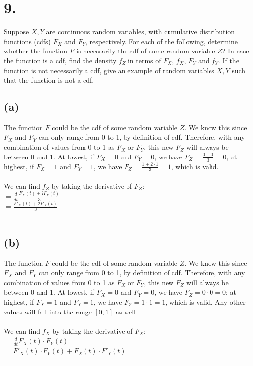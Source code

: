 \documentclass{article}
\begin{document}
\section*{9.}
{\Large 
Suppose $X,Y$ are continuous random variables, with cumulative distribution
functions (cdfs) $F_{X}$ and $F_{Y}$, respectively. For each of
the following, determine whether the function $F$ is necessarily
the cdf of some random variable $Z$? In case the function is a cdf,
find the density $f_{Z}$ in terms of $F_{X}$, $f_{X}$, $F_{Y}$
and $f_{Y}$. If the function is not necessarily a cdf, give an example
of random variables $X,Y$ such that the function is not a cdf. 

\subsection*{(a)}
The function $F$ could be the cdf of some random variable $Z$. We know this since $F_X$ and $F_Y$ can only range from 0 to 1, by definition of cdf. Therefore, with any combination of values from 0 to 1 as $F_X$ or $F_Y$, this new $F_Z$ will always be between 0 and 1. At lowest, if $F_X = 0$ and $F_Y = 0$, we have $F_Z = \frac{0 + 0}{3} = 0$; at highest, if $F_X = 1$ and $F_Y = 1$, we have $F_Z = \frac{1 + 2 \cdot 1}{3} = 1$, which is valid. \\ \\ 
We can find $f_Z$ by taking the derivative of $F_Z:$ \\ 
$ = \frac{d}{dt} \frac{F_X(t) + 2F_Y(t)}{3}$ \\ 
$ = \frac{{F'}_X(t) + 2{F'}_Y(t)}{3}$ \\ 
$ = $  \\ 

\subsection*{(b)}
The function $F$ could be the cdf of some random variable $Z$. We know this since $F_X$ and $F_Y$ can only range from 0 to 1, by definition of cdf. Therefore, with any combination of values from 0 to 1 as $F_X$ or $F_Y$, this new $F_Z$ will always be between 0 and 1. At lowest, if $F_X = 0$ and $F_Y = 0$, we have $F_Z = 0 \cdot 0 = 0$; at highest, if $F_X = 1$ and $F_Y = 1$, we have $F_Z = 1 \cdot 1 = 1$, which is valid. Any other values will fall into the range $[0, 1]$ as well. \\ \\ 
We can find $f_X$ by taking the derivative of $F_X:$ \\ 
$ = \frac{d}{dt} F_X(t) \cdot F_Y(t)$ \\ 
$ = {F'}_X(t) \cdot F_Y(t) + F_X(t) \cdot {F'}_Y(t)$ \\ 
$ = $  \\ 

}
\end{document}
